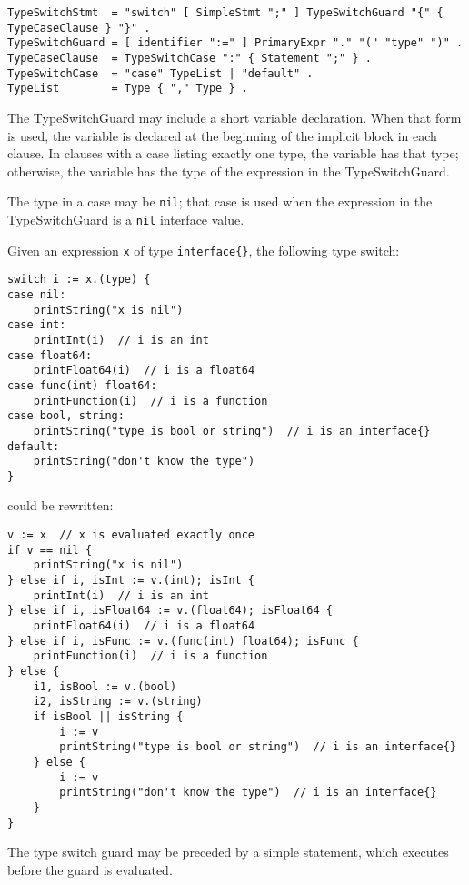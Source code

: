 \begin{Verbatim}[frame=single]
TypeSwitchStmt  = "switch" [ SimpleStmt ";" ] TypeSwitchGuard "{" { TypeCaseClause } "}" .
TypeSwitchGuard = [ identifier ":=" ] PrimaryExpr "." "(" "type" ")" .
TypeCaseClause  = TypeSwitchCase ":" { Statement ";" } .
TypeSwitchCase  = "case" TypeList | "default" .
TypeList        = Type { "," Type } .
\end{Verbatim}

The TypeSwitchGuard may include a
short variable declaration.
When that form is used, the variable is declared at the beginning of the
implicit block in each clause. In clauses with a case
listing exactly one type, the variable has that type; otherwise, the
variable has the type of the expression in the TypeSwitchGuard.

The type in a case may be \texttt{nil}; that case is used when the
expression in the TypeSwitchGuard is a \texttt{nil} interface value.

Given an expression \texttt{x} of type \texttt{interface\{\}}, the
following type switch:

\begin{Verbatim}[frame=single]
switch i := x.(type) {
case nil:
    printString("x is nil")
case int:
    printInt(i)  // i is an int
case float64:
    printFloat64(i)  // i is a float64
case func(int) float64:
    printFunction(i)  // i is a function
case bool, string:
    printString("type is bool or string")  // i is an interface{}
default:
    printString("don't know the type")
}
\end{Verbatim}

could be rewritten:

\begin{Verbatim}[frame=single]
v := x  // x is evaluated exactly once
if v == nil {
    printString("x is nil")
} else if i, isInt := v.(int); isInt {
    printInt(i)  // i is an int
} else if i, isFloat64 := v.(float64); isFloat64 {
    printFloat64(i)  // i is a float64
} else if i, isFunc := v.(func(int) float64); isFunc {
    printFunction(i)  // i is a function
} else {
    i1, isBool := v.(bool)
    i2, isString := v.(string)
    if isBool || isString {
        i := v
        printString("type is bool or string")  // i is an interface{}
    } else {
        i := v
        printString("don't know the type")  // i is an interface{}
    }
}
\end{Verbatim}

The type switch guard may be preceded by a simple statement, which
executes before the guard is evaluated.

